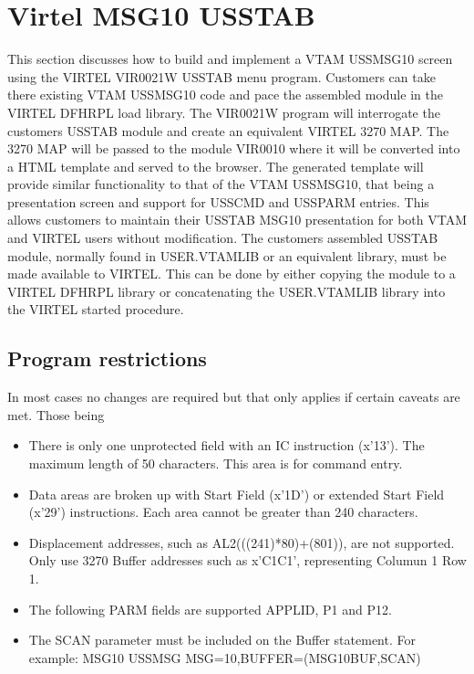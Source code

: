\documentclass[letterpaper,10pt,english]{sphinxmanual}
\begin{document}
\chapter{Virtel MSG10 USSTAB}
\label{\detokenize{Customization:virtel-msg10-usstab}}\label{\detokenize{Customization:index-123}}
\sphinxAtStartPar
This section discusses how to build and implement a VTAM USSMSG10 screen using the VIRTEL VIR0021W USSTAB menu program. Customers can take there existing VTAM USSMSG10 code and pace the assembled module in the VIRTEL DFHRPL load library. The VIR0021W program will interrogate the customers USSTAB module and create an equivalent VIRTEL 3270 MAP. The 3270 MAP will be passed to the module VIR0010 where it will be converted into a HTML template and served to the browser. The generated template will provide similar functionality to that of the VTAM USSMSG10, that being a presentation screen and support for USSCMD and USSPARM entries. This allows customers to maintain their USSTAB MSG10 presentation for both VTAM and VIRTEL users without modification. The customers assembled USSTAB module, normally found in USER.VTAMLIB or an equivalent library, must be made available to VIRTEL. This can be done by either copying the module to a VIRTEL DFHRPL library or concatenating the USER.VTAMLIB library into the VIRTEL started procedure.


\section{Program restrictions}
\label{\detokenize{Customization:program-restrictions}}
\sphinxAtStartPar
In most cases no changes are required but that only applies if certain caveats are met. Those being
\begin{itemize}
\item {} 
\sphinxAtStartPar
There is only one unprotected field with an IC instruction (x’13’). The maximum length of 50 characters. This area is for command entry.

\item {} 
\sphinxAtStartPar
Data areas are broken up with Start Field (x’1D’) or extended Start Field (x’29’) instructions. Each area cannot be greater than 240 characters.

\item {} 
\sphinxAtStartPar
Displacement addresses, such as AL2(((24\sphinxhyphen{}1)*80)+(80\sphinxhyphen{}1)), are not supported. Only use 3270 Buffer addresses such as x’C1C1’, representing Columun 1 Row 1.

\item {} 
\sphinxAtStartPar
The following PARM fields are supported \sphinxhyphen{} APPLID, P1 and P12.

\item {} 
\sphinxAtStartPar
The SCAN parameter must be included on the Buffer statement. For example:\sphinxhyphen{} MSG10 USSMSG MSG=10,BUFFER=(MSG10BUF,SCAN)

\end{itemize}
\end{document}
